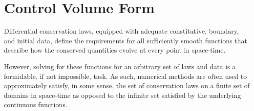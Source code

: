 \documentclass[article,12pt,draft]{WisconsinThesis}
\begin{document}
\section{Control Volume Form}

Differential conservation laws, equipped with adequate constitutive, boundary, and initial data, define the requirements for all sufficiently smooth functions that describe how the conserved quantities evolve at every point in space-time.

However, solving for these functions for an arbitrary set of laws and data is a formidable, if not impossible, task.
As such, numerical methods are often used to approximately satisfy, in some sense, the set of conservation laws on a finite set of domains in space-time as opposed to the infinite set satisfied by the underlying continuous functions.
\end{document}
